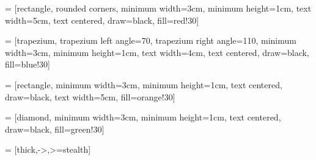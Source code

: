 \usetikzlibrary{shapes.geometric, arrows}

 = [rectangle, rounded corners, minimum width=3cm, minimum height=1cm, text width=5cm, text centered, draw=black, fill=red!30]

 = [trapezium, trapezium left angle=70, trapezium right angle=110, minimum width=3cm, minimum height=1cm, text width=4cm, text centered, draw=black, fill=blue!30]

 = [rectangle, minimum width=3cm, minimum height=1cm, text centered, draw=black, text width=5cm, fill=orange!30]

 = [diamond, minimum width=3cm, minimum height=1cm, text centered, draw=black, fill=green!30]

 = [thick,->,>=stealth]